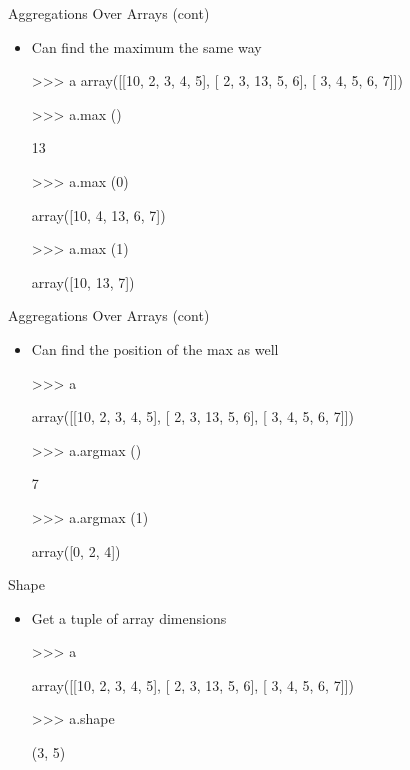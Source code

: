 \documentclass[aspectratio=169]{beamer}
\begin{document}
\begin{frame}[fragile]{Aggregations Over Arrays (cont)}

\begin{itemize}
\item Can find the maximum the same way

\begin{SQL}
>>> a
array([[10, 2,  3, 4, 5],
       [ 2, 3, 13, 5, 6],
       [ 3, 4,  5, 6, 7]])

>>> a.max ()

13

>>> a.max (0)

array([10, 4, 13, 6, 7])

>>> a.max (1)

array([10, 13, 7])
\end{SQL}
\end{itemize}
\end{frame}

\begin{frame}[fragile]{Aggregations Over Arrays (cont)}

\begin{itemize}
\item Can find the position of the max as well

\begin{SQL}
>>> a

array([[10, 2,  3, 4, 5],
       [ 2, 3, 13, 5, 6],
       [ 3, 4,  5, 6, 7]])

>>> a.argmax ()

7

>>> a.argmax (1)

array([0, 2, 4])
\end{SQL}
\end{itemize}
\end{frame}

\begin{frame}[fragile]{Shape}

\begin{itemize}
\item Get a tuple of array dimensions

\begin{SQL}
>>> a

array([[10, 2,  3, 4, 5],
       [ 2, 3, 13, 5, 6],
       [ 3, 4,  5, 6, 7]])

>>> a.shape

(3, 5)
\end{SQL}
\end{itemize}
\end{frame}
\end{document}
